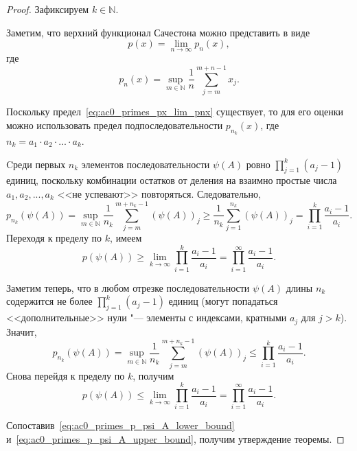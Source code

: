 \documentclass[a4paper,openbib]{article}
\renewcommand{\leq}{\leqslant}
\renewcommand{\geq}{\geqslant} %
\theoremstyle{definition}
\begin{document}
\begin{proof}
	Зафиксируем $k\in\mathbb{N}$.

	Заметим, что верхний функционал Сачестона можно представить в виде
	\begin{equation}
		\label{eq:ac0_primes_px_lim_pnx}
		p(x) = \lim_{n\to\infty} p_n(x)
		,
	\end{equation}
	где
	\begin{equation}
		p_n(x) = \sup_{m\in\mathbb{N}}  \frac{1}{n} \sum_{j=m}^{m+n-1} x_j
		.
	\end{equation}

	Поскольку предел~\eqref{eq:ac0_primes_px_lim_pnx} существует, то для его оценки можно использовать предел подпоследовательности
	$p_{n_k}(x)$, где $n_k = a_1\cdot a_2 \cdot ... \cdot a_k$.


	Cреди первых $n_k$ элементов последовательности $\psi(A)$
	ровно $\prod_{j=1}^k (a_j-1)$ единиц, поскольку комбинации остатков от деления
	на взаимно простые числа $a_1, a_2, ..., a_k$ <<не успевают>> повторяться.
	Следовательно,
	\begin{equation}
		p_{n_k}(\psi(A)) =
		\sup_{m\in\mathbb{N}}  \frac{1}{n_k} \sum_{j=m}^{m+n_k-1} (\psi(A))_j
		\geq
		\frac{1}{n_k} \sum_{j=1}^{n_k} (\psi(A))_j
		=
		\prod_{i=1}^k \frac{a_i-1}{a_i}
		.
	\end{equation}
	Переходя к пределу по $k$, имеем
	\begin{equation}
		\label{eq:ac0_primes_p_psi_A_lower_bound}
		p(\psi(A)) \geq \lim_{k\to \infty} \prod_{i=1}^k \frac{a_i-1}{a_i}
		=
		\prod_{i=1}^\infty \frac{a_i-1}{a_i}
		.
	\end{equation}

	Заметим теперь, что в любом отрезке последовательности $\psi(A)$ длины $n_k$
	содержится не более $\prod_{j=1}^k (a_j-1)$ единиц
	(могут попадаться <<дополнительные>> нули "--- элементы с индексами, кратными $a_j$ для $j>k$).
	Значит,
	\begin{equation}
		p_{n_k}(\psi(A)) =
		\sup_{m\in\mathbb{N}}  \frac{1}{n_k} \sum_{j=m}^{m+n_k-1} (\psi(A))_j
		\leq
		\prod_{i=1}^k \frac{a_i-1}{a_i}
		.
	\end{equation}
	Снова перейдя к пределу по $k$, получим
	\begin{equation}
		\label{eq:ac0_primes_p_psi_A_upper_bound}
		p(\psi(A)) \leq \lim_{k\to \infty} \prod_{i=1}^k \frac{a_i-1}{a_i}
		=
		\prod_{i=1}^\infty \frac{a_i-1}{a_i}
		.
	\end{equation}

	Сопоставив~\eqref{eq:ac0_primes_p_psi_A_lower_bound} и~\eqref{eq:ac0_primes_p_psi_A_upper_bound}, получим утверждение теоремы.
\end{proof}
\end{document}
